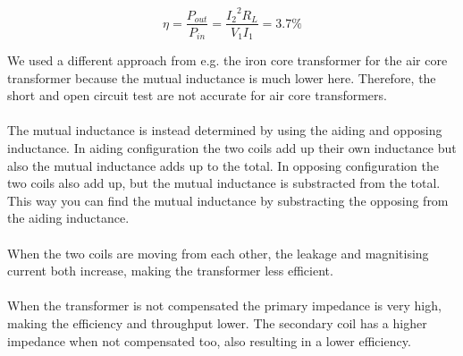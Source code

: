 \documentclass[final]{scrartcl} %
\begin{document}
\begin{equation}
	\eta = \frac{P_{out}}{P_{in}} = \frac{{I_2}^2 R_L}{V_1 I_1} = 3.7\%
	\label{eq:efficiencyMeasured}
\end{equation}

We used a different approach from e.g. the iron core transformer for the air core transformer because the mutual inductance is much lower here. Therefore, the short and open circuit test are not accurate for air core transformers.
\\ \\
The mutual inductance is instead determined by using the aiding and opposing inductance. In aiding configuration the two coils add up their own inductance but also the mutual inductance adds up to the total. In opposing configuration the two coils also add up, but the mutual inductance is substracted from the total. This way you can find the mutual inductance by substracting the opposing from the aiding inductance.
\\ \\
When the two coils are moving from each other, the leakage and magnitising current both increase, making the transformer less efficient.
\\ \\
When the transformer is not compensated the primary impedance is very high, making the efficiency and throughput lower. The secondary coil has a higher impedance when not compensated too, also resulting in a lower efficiency.
\end{document}
